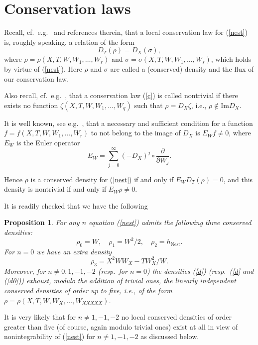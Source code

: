 \documentclass[12pt]{article}
\newtheorem{pro}{Proposition}
\begin{document}
\section{Conservation laws}\label{sec:cl}
Recall, cf.\ e.g.\ \cite{Ibragimov, mikshab, Olver, Dorfman, bp, ps, scg, fer} and references therein, that a local conservation law for (\ref{nest}) is, roughly speaking, a relation of the form
\begin{equation}\label{c}
D_T(\rho)=D_X(\sigma),
\end{equation}
where $\rho=\rho(X,T,W,W_1,\dots,W_r)$ and $\sigma=\sigma(X,T,W,W_1,\dots,W_s)$, which holds by virtue of (\ref{nest}).
Here $\rho$ and $\sigma$ are called a (conserved) density and the flux of our conservation law.

Also recall, cf.\ e.g.\ \cite{ps}, that a conservation law (\ref{c}) is called nontrivial if there exists no function %
$\zeta(X,T,W,W_1,\dots,W_{q})$ such that $\rho=D_X\zeta$, i.e., $\rho\not\in\mathrm{Im} D_X$.

It is well known, see e.g.\ \cite{Olver, Dorfman}, that a necessary and sufficient condition for a function $f=f(X,T,W,W_1,\dots,W_r)$ to not belong to the image of $D_X$ is $E_W f\neq 0$, where $E_W$ is the Euler operator
\[
E_W=\sum \limits_{j=0}^\infty (-D_X)^{j}\circ \displaystyle\frac{\partial}{\partial W_j}.
\]

Hence $\rho$ is a conserved density for (\ref{nest}) if and only if $E_W D_T(\rho)=0$, and this density is nontrivial if and only if $E_W \rho\neq 0$.

It is readily checked that we have the following
\begin{pro}\label{cl1}
For any $n$ equation
(\ref{nest}) admits the following three conserved densities:
\begin{equation}\label{d}
\rho_0=W,\quad \rho_1=W^2/2,\quad \rho_2=h_{\mathrm{Nest}}.
\end{equation}
For $n=0$ we have an extra density
\begin{equation}\label{d0}
\rho_3=X^2 W W_X -T W_X^2/W.
\end{equation}
Moreover, for $n\neq 0,1,-1,-2$ (resp.\ for $n=0$) the densities (\ref{d}) (resp.\ (\ref{d} and (\ref{d0})) exhaust, modulo the addition of trivial ones,  the linearly independent conserved densities of order up to five, i.e., of the form $\rho=\rho(X,T,W,W_X,\dots,W_{XXXXX})$.
\end{pro}
It is very likely that for $n\neq 1,-1,-2$ no local conserved densities of order greater than five (of course, again modulo trivial ones) exist at all in view of nonintegrability of (\ref{nest}) for $n\neq 1,-1,-2$ as discussed below.
\end{document}
